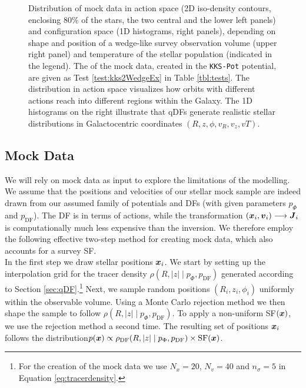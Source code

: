 

\begin{figure*}[!htbp]
\caption{Distribution of mock data in action space (2D iso-density contours, enclosing 80\% of the stars, the two central and the lower left panels) and configuration space (1D histograms, right panels), depending on shape and position of a wedge-like survey observation volume (upper right panel) and temperature of the stellar population (indicated in the legend). The \pmodel{} of the mock data, created in the \texttt{KKS-Pot} potential, are given as Test \ref{test:kks2WedgeEx} in Table \ref{tbl:tests}. The distribution in action space visualizes how orbits with different actions reach into different regions within the Galaxy. The 1D histograms on the right illustrate that qDFs generate realistic stellar distributions in Galactocentric coordinates $(R,z,\phi,v_R,v_z,vT)$. } 
\label{fig:kks2WedgeEx}
\end{figure*}




\subsection{Mock Data} \label{sec:mockdata}

We will rely on mock data as input to explore the limitations of the modelling. We assume that the positions and velocities of our stellar mock sample are indeed drawn from our assumed family of potentials and DFs (with given parameters $p_\Phi$ and $p_\text{DF}$). The DF is in terms of actions, while the transformation $(\boldsymbol{x}_i,\boldsymbol{v}_i) \longrightarrow \boldsymbol{J}_i$ is computationally much less expensive than the inversion. We therefore employ the following effective two-step method for creating mock data, which also accounts for a survey SF.\\

In the first step we draw stellar positions $\boldsymbol{x}_i$. We start by setting up the interpolation grid for the tracer density $\rho(R,|z| \mid p_\Phi, p_\text{DF})$ generated according to Section \ref{sec:qDF}.\footnote{For the creation of the mock data we use $N_x = 20$, $N_v = 40$ and $n_\sigma=5$ in Equation \ref{eq:tracerdensity}.} Next, we sample random positions $(R_i,z_i,\phi_i)$ uniformly within the observable volume. Using a Monte Carlo rejection method we then shape the sample to follow $\rho(R,|z| \mid p_\Phi, p_\text{DF})$. To apply a non-uniform SF$(\boldsymbol{x})$, we use the rejection method a second time. The resulting set of positions $\boldsymbol{x}_i$ follows the distribution$p(\boldsymbol{x}) \propto \rho_\text{DF}(R,|z| \mid p_{\Phi},p_\text{DF}) \times \text{SF}(\boldsymbol{x})$.\\

